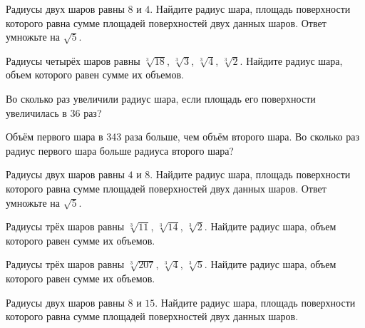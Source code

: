 \documentclass[a4paper]{article}
\begin{document}
\begin{taskBN}{88}
Радиусы двух шаров равны $8$ и $4$. Найдите радиус шара, площадь поверхности которого равна сумме площадей поверхностей двух данных шаров. Ответ умножьте на $\sqrt{5}$.
\end{taskBN}

\begin{taskBN}{89}
Радиусы четырёх шаров равны $\sqrt[3]{18}$, $\sqrt[3]{3}$, $\sqrt[3]{4}$, $\sqrt[3]{2}$. Найдите радиус шара, объем которого равен сумме их объемов.
\end{taskBN}

\begin{taskBN}{90}
Во сколько раз увеличили радиус шара, если площадь его поверхности увеличилась в 36 раз?
\end{taskBN}

\begin{taskBN}{91}
Объём первого шара в 343 раза больше, чем объём второго шара. Во сколько раз радиус первого шара больше радиуса второго шара?
\end{taskBN}

\begin{taskBN}{92}
Радиусы двух шаров равны $4$ и $8$. Найдите радиус шара, площадь поверхности которого равна сумме площадей поверхностей двух данных шаров. Ответ умножьте на $\sqrt{5}$.
\end{taskBN}

\begin{taskBN}{93}
Радиусы трёх шаров равны $\sqrt[3]{11}$, $\sqrt[3]{14}$, $\sqrt[3]{2}$. Найдите радиус шара, объем которого равен сумме их объемов.
\end{taskBN}

\begin{taskBN}{94}
Радиусы трёх шаров равны $\sqrt[3]{207}$, $\sqrt[3]{4}$, $\sqrt[3]{5}$. Найдите радиус шара, объем которого равен сумме их объемов.
\end{taskBN}

\begin{taskBN}{95}
Радиусы двух шаров равны $8$ и $15$. Найдите радиус шара, площадь поверхности которого равна сумме площадей поверхностей двух данных шаров.
\end{taskBN}
\end{document}
